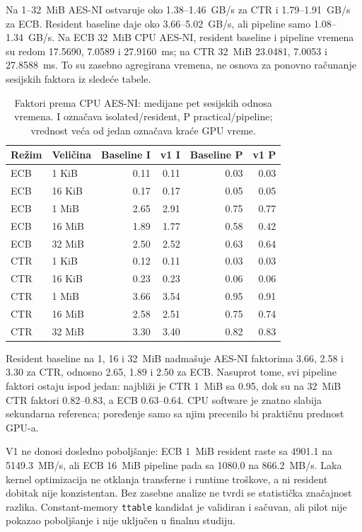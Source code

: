 Na 1--32~MiB AES-NI ostvaruje oko 1.38--1.46~GB/s za CTR i
1.79--1.91~GB/s za ECB. Resident baseline daje oko 3.66--5.02~GB/s,
ali pipeline samo 1.08--1.34~GB/s. Na ECB 32~MiB CPU AES-NI,
resident baseline i pipeline vremena su redom 17.5690, 7.0589 i
27.9160~ms; na CTR 32~MiB 23.0481, 7.0053 i 27.8588~ms.
To su zasebno agregirana vremena, ne osnova za ponovno računanje
sesijskih faktora iz sledeće tabele.

\begin{table}[htbp]
\centering
\small
\caption{Faktori prema CPU AES-NI: medijane pet sesijskih odnosa vremena.
I označava isolated/resident, P practical/pipeline; vrednost veća od jedan
označava kraće GPU vreme.}
\label{tab:cpu-gpu-final-speedup}
\begin{tabular}{llrrrr}
\toprule
Režim & Veličina & Baseline I & v1 I & Baseline P & v1 P \\
\midrule
ECB & 1 KiB & 0.11 & 0.11 & 0.03 & 0.03 \\
ECB & 16 KiB & 0.17 & 0.17 & 0.05 & 0.05 \\
ECB & 1 MiB & 2.65 & 2.91 & 0.75 & 0.77 \\
ECB & 16 MiB & 1.89 & 1.77 & 0.58 & 0.42 \\
ECB & 32 MiB & 2.50 & 2.52 & 0.63 & 0.64 \\
\midrule
CTR & 1 KiB & 0.12 & 0.11 & 0.03 & 0.03 \\
CTR & 16 KiB & 0.23 & 0.23 & 0.06 & 0.06 \\
CTR & 1 MiB & 3.66 & 3.54 & 0.95 & 0.91 \\
CTR & 16 MiB & 2.58 & 2.51 & 0.75 & 0.74 \\
CTR & 32 MiB & 3.30 & 3.40 & 0.82 & 0.83 \\
\bottomrule
\end{tabular}
\end{table}

Resident baseline na 1, 16 i 32~MiB nadmašuje AES-NI faktorima
3.66, 2.58 i 3.30 za CTR, odnosno 2.65, 1.89 i 2.50 za ECB.
Nasuprot tome, svi pipeline faktori ostaju ispod jedan: najbliži je
CTR 1~MiB sa 0.95, dok su na 32~MiB CTR faktori 0.82--0.83, a ECB
0.63--0.64. CPU software je znatno slabija sekundarna referenca;
poređenje samo sa njim precenilo bi praktičnu prednost GPU-a.

V1 ne donosi dosledno poboljšanje: ECB 1~MiB resident raste sa
4901.1 na 5149.3~MB/s, ali ECB 16~MiB pipeline pada sa 1080.0 na
866.2~MB/s. Laka kernel optimizacija ne otklanja transferne i runtime
troškove, a ni resident dobitak nije konzistentan. Bez zasebne analize
ne tvrdi se statistička značajnost razlika. Constant-memory
\texttt{ttable} kandidat je validiran i sačuvan, ali pilot nije pokazao
poboljšanje i nije uključen u finalnu studiju.


